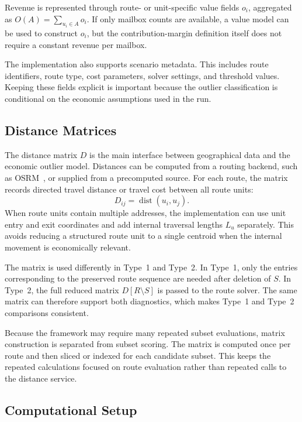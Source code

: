 \documentclass[preprint,12pt]{elsarticle}
\begin{document}
Revenue is represented through route- or unit-specific value fields $o_i$, aggregated as $O(A)=\sum_{u_i\in A}o_i$. If only mailbox counts are available, a value model can be used to construct $o_i$, but the contribution-margin definition itself does not require a constant revenue per mailbox.

The implementation also supports scenario metadata. This includes route identifiers, route type, cost parameters, solver settings, and threshold values. Keeping these fields explicit is important because the outlier classification is conditional on the economic assumptions used in the run.

\subsection{Distance Matrices}
\label{subsec:distance-matrices}

The distance matrix $D$ is the main interface between geographical data and the economic outlier model. Distances can be computed from a routing backend, such as OSRM~\cite{luxen2011osrm}, or supplied from a precomputed source. For each route, the matrix records directed travel distance or travel cost between all route units:
\[
D_{ij}=\operatorname{dist}(u_i,u_j).
\]
When route units contain multiple addresses, the implementation can use unit entry and exit coordinates and add internal traversal lengths $L_u$ separately. This avoids reducing a structured route unit to a single centroid when the internal movement is economically relevant.

The matrix is used differently in Type~1 and Type~2. In Type~1, only the entries corresponding to the preserved route sequence are needed after deletion of $S$. In Type~2, the full reduced matrix $D[R\setminus S]$ is passed to the route solver. The same matrix can therefore support both diagnostics, which makes Type~1 and Type~2 comparisons consistent.

Because the framework may require many repeated subset evaluations, matrix construction is separated from subset scoring. The matrix is computed once per route and then sliced or indexed for each candidate subset. This keeps the repeated calculations focused on route evaluation rather than repeated calls to the distance service.

\subsection{Computational Setup}
\label{subsec:computational-setup}
\end{document}
